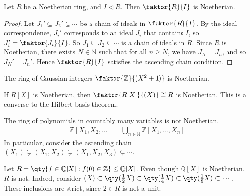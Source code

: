 \begin{lemma} \label{lem:13.2}
	Let $R$ be a Noetherian ring, and $I \triangleleft R$.
	Then $\faktor{R}{I}$ is Noetherian.
\end{lemma}

\begin{proof}
	Let $J_1' \subseteq J_2' \subseteq \cdots$ be a chain of ideals in $\faktor{R}{I}$.
	By the ideal correspondence, $J_i'$ corresponds to an ideal $J_i$ that contains $I$, so $J_i' = \faktor{J_i}{I}$.
	So $J_1 \subseteq J_2 \subseteq \cdots$ is a chain of ideals in $R$.
	Since $R$ is Noetherian, there exists $N \in \mathbb N$ such that for all $n \geq N$, we have $J_N = J_n$, and so $J_N' = J_n'$.
	Hence $\faktor{R}{I}$ satisfies the ascending chain condition.
\end{proof}

\begin{example}
	The ring of Gaussian integers $\faktor{\mathbb Z}{(X^2 + 1)}$ is Noetherian.
\end{example}

\begin{example}
	If $R[X]$ is Noetherian, then $\faktor{R[X]}{(X)} \cong R$ is Noetherian.
	This is a converse to the Hilbert basis theorem.
\end{example} 

\begin{example}
	The ring of polynomials in countably many variables is not Noetherian.
	\begin{align*}
		\mathbb Z[X_1, X_2, \dots] = \bigcup_{n \in \mathbb N} \mathbb Z[X_1, \dots, X_n]
	\end{align*}
	In particular, consider the ascending chain $(X_1) \subsetneq (X_1, X_2) \subsetneq (X_1, X_2, X_3) \subsetneq \cdots$.
\end{example} 

\begin{example}
	Let $R = \qty{f \in \mathbb Q[X] : f(0) \in \mathbb Z} \leq \mathbb Q[X]$.
	Even though $\mathbb Q[X]$ is Noetherian, $R$ is not.
	Indeed, consider $(X) \subset \qty(\frac{1}{2} X) \subset \qty(\frac{1}{4}X) \subset \qty(\frac{1}{8}X) \subset \cdots$.
	These inclusions are strict, since $2 \in R$ is not a unit.
\end{example} 